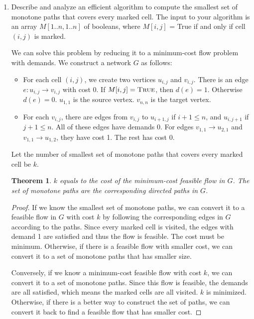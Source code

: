 \documentclass[letterpaper,11pt]{article}
\newtheorem{theorem}{Theorem}
\begin{document}
\begin{enumerate}
\begin{enumerate}
\item
Describe and analyze an efficient algorithm to compute the smallest set of
monotone paths that covers every marked cell. The input to your algorithm is an
array $M[1..n,1..n]$ of booleans, where $M[i, j]$ = True if and only if cell
$(i, j)$ is marked.

\begin{solution}
  We can solve this problem by reducing it to a minimum-cost flow problem with
  demands.
  We construct a network $G$ as follows:
  \begin{itemize}
    \item For each cell $(i,j)$, we create two vertices $u_{i,j}$ and $v_{i,j}$.
      There is an edge $e: u_{i,j} \rightarrow v_{i,j}$ with cost 0.  If
      $M[i,j]=\text{\textsc{True}}$, then $d(e)=1$. Otherwise $d(e)=0$.
      $u_{1,1}$ is the source vertex. $v_{n,n}$ is the target vertex.
    \item For each $v_{i,j}$, there are edges from $v_{i,j}$ to $u_{i+1,j}$ if
      $i+1 \leq n$, and $u_{i,j+1}$ if $j+1 \leq n$. 
      All of these edges have demands 0.
      For edges $v_{1,1} \rightarrow u_{2,1}$ and $v_{1,1} \rightarrow u_{1,2}$,
      they have cost 1. The rest has cost 0.
  \end{itemize}
  Let the number of smallest set of monotone paths that covers every marked cell
  be $k$.
  \begin{theorem}
    $k$ equals to the cost of the minimum-cost feasible flow in $G$.
    The set of monotone paths are the corresponding directed paths in $G$.
  \end{theorem}
  \begin{proof}
    If we know the smallest set of monotone paths, we can convert it 
    to a feasible flow in $G$ with cost $k$ by following the corresponding
    edges in $G$ according to the paths.
    Since every marked cell is visited, the edges with demand 1 
    are satisfied and thus the flow is feasible.
    The cost must be minimum. Otherwise, if there is a feasible flow with 
    smaller cost, we can convert it to a set of monotone paths that has 
    smaller size.
    
    Conversely, if we know a minimum-cost feasible flow with cost $k$, we 
    can convert it to a set of monotone paths.
    Since this flow is feasible, the demands are all satisfied, which 
    means the marked cells are all visited.
    $k$ is minimized. Otherwise, if there is a better way to construct 
    the set of paths, we can convert it back to find a feasible flow
    that has smaller cost.
  \end{proof}


\end{solution}
\end{enumerate}
\end{enumerate}
\end{document}
